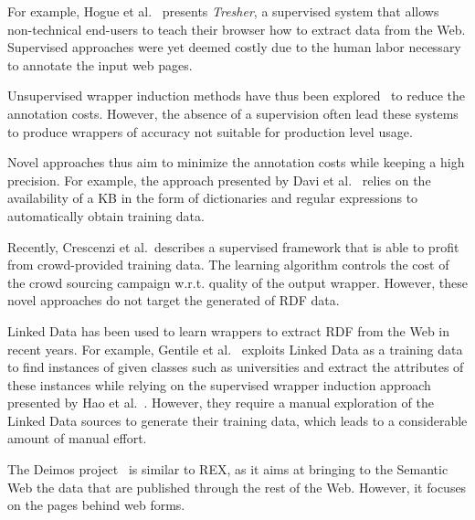 For example, Hogue et al.~\cite{Hogue:2005:TAU:1060745.1060762} presents \emph{Tresher}, a supervised system that allows non-technical end-users to teach their browser how to extract data from the Web. 
Supervised approaches were yet deemed costly due to the human labor necessary to annotate the input web pages. 

Unsupervised wrapper induction methods have thus been explored~\cite{exalg,DBLP:journals/aai/CrescenziM08} to reduce the annotation costs. 
However, the absence of a supervision often lead these systems to produce wrappers of accuracy not suitable for production level usage.

Novel approaches thus aim to minimize the annotation costs while keeping a high precision.
For example, the approach presented by Davi et al.~\cite{Dalvi:2011:AWL:1938545.1938547} relies on the availability of a  \ac{KB} in the form of dictionaries and regular expressions to automatically obtain training data. 

Recently, Crescenzi et al.~\cite{Crescenzi2013}describes a supervised framework that is able to profit from crowd-provided training data. 
The learning algorithm controls the cost of the crowd sourcing campaign w.r.t. quality of the output wrapper.
However, these novel approaches do not target the generated of \ac{RDF} data.

Linked Data has been used to learn wrappers to extract \ac{RDF} from the Web in recent years. 
For example, Gentile et al.~\cite{Gentile2013} exploits Linked Data as a training data to find instances of given classes such as universities and extract the attributes of these instances while relying on the supervised wrapper induction approach presented by Hao et al.~\cite{Hao2011}. However, they require a manual exploration of the Linked Data sources to generate their training data, which leads to a considerable amount of manual effort.

The {\sc Deimos} project~\cite{conf/aaaiss/ParundekarKA10} is similar to REX, as it aims at bringing to the Semantic Web the data that are published through the rest of the Web. 
However, it focuses on the pages behind web forms.


